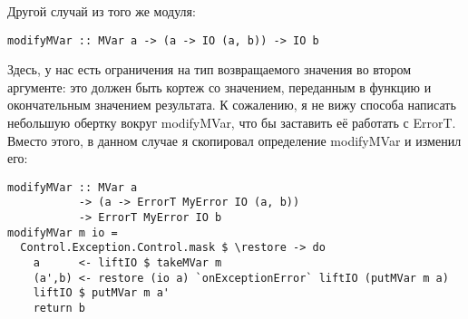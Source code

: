 Другой случай из того же модуля:

\begin{lstlisting}
modifyMVar :: MVar a -> (a -> IO (a, b)) -> IO b
\end{lstlisting}

Здесь, у нас есть ограничения на тип возвращаемого значения во втором аргументе: это должен быть кортеж со значением, переданным в функцию и окончательным значением результата. К сожалению, я не вижу способа написать небольшую обертку вокруг modifyMVar, что бы заставить её работать с ErrorT. Вместо этого, в данном случае я скопировал определение modifyMVar и изменил его:

\begin{lstlisting}
modifyMVar :: MVar a
           -> (a -> ErrorT MyError IO (a, b))
           -> ErrorT MyError IO b
modifyMVar m io =
  Control.Exception.Control.mask $ \restore -> do
    a      <- liftIO $ takeMVar m
    (a',b) <- restore (io a) `onExceptionError` liftIO (putMVar m a)
    liftIO $ putMVar m a'
    return b
\end{lstlisting}
